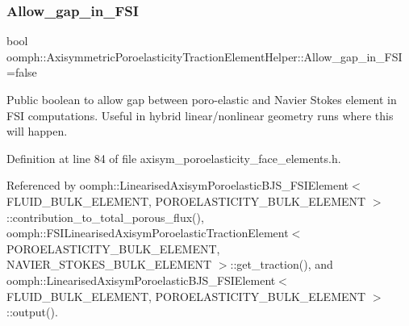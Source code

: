 \subsubsection{\texorpdfstring{Allow\+\_\+gap\+\_\+in\+\_\+\+F\+SI}{Allow\_gap\_in\_FSI}}
{\footnotesize\ttfamily bool oomph\+::\+Axisymmetric\+Poroelasticity\+Traction\+Element\+Helper\+::\+Allow\+\_\+gap\+\_\+in\+\_\+\+F\+SI =false}



Public boolean to allow gap between poro-\/elastic and Navier Stokes element in F\+SI computations. Useful in hybrid linear/nonlinear geometry runs where this will happen. 



Definition at line 84 of file axisym\+\_\+poroelasticity\+\_\+face\+\_\+elements.\+h.



Referenced by oomph\+::\+Linearised\+Axisym\+Poroelastic\+B\+J\+S\+\_\+\+F\+S\+I\+Element$<$ F\+L\+U\+I\+D\+\_\+\+B\+U\+L\+K\+\_\+\+E\+L\+E\+M\+E\+N\+T, P\+O\+R\+O\+E\+L\+A\+S\+T\+I\+C\+I\+T\+Y\+\_\+\+B\+U\+L\+K\+\_\+\+E\+L\+E\+M\+E\+N\+T $>$\+::contribution\+\_\+to\+\_\+total\+\_\+porous\+\_\+flux(), oomph\+::\+F\+S\+I\+Linearised\+Axisym\+Poroelastic\+Traction\+Element$<$ P\+O\+R\+O\+E\+L\+A\+S\+T\+I\+C\+I\+T\+Y\+\_\+\+B\+U\+L\+K\+\_\+\+E\+L\+E\+M\+E\+N\+T, N\+A\+V\+I\+E\+R\+\_\+\+S\+T\+O\+K\+E\+S\+\_\+\+B\+U\+L\+K\+\_\+\+E\+L\+E\+M\+E\+N\+T $>$\+::get\+\_\+traction(), and oomph\+::\+Linearised\+Axisym\+Poroelastic\+B\+J\+S\+\_\+\+F\+S\+I\+Element$<$ F\+L\+U\+I\+D\+\_\+\+B\+U\+L\+K\+\_\+\+E\+L\+E\+M\+E\+N\+T, P\+O\+R\+O\+E\+L\+A\+S\+T\+I\+C\+I\+T\+Y\+\_\+\+B\+U\+L\+K\+\_\+\+E\+L\+E\+M\+E\+N\+T $>$\+::output().

